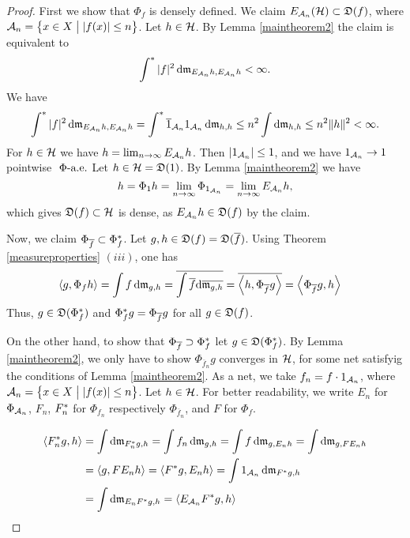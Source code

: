 \begin{proof}

First we show that $\Phi_f$ is densely defined. 
We claim $E_{\mathcal{A}_n}(\mathcal{H}) \subset \mathfrak{D}(f)$, where $\mathcal{A}_n = 
\left\lbrace x \in X \bigm | | f(x) | \leq n \right\rbrace$.
Let $h \in \mathcal{H}$. By Lemma \ref{maintheorem2} the claim is
equivalent to 
\[
\int ^{*} |f|^2 \operatorname{d}\! \mathfrak{m}_{E_{\mathcal{A}_n}h, E_{\mathcal{A}_n}h} < \infty.
\]
We have 
\begin{align*}
  \int ^{*} |f|^2 \operatorname{d}\! \mathfrak{m}_{E_{\mathcal{A}_n}h, E_{\mathcal{A}_n}h} = 
  \int ^{*} \overline{1}_{\mathcal{A}_n} 1_{\mathcal{A}_n} \operatorname{d}\! \mathfrak{m}_{h,h} \leq
  n^2 \int \operatorname{d}\! \mathfrak{m}_{h,h} \leq n^2 \| h\|^2 < \infty.
\end{align*}
For $h \in \mathcal{H}$ we have $h = \lim_{n \to \infty} E_{\mathcal{A}_n} h$. 
Then $|1_{\mathcal{A}_n}| \leq 1$, and we have
$1_{\mathcal{A}_n} \to 1 $ pointwise $~\Phi\text{-a.e.}$
Let $h \in \mathcal{H} = \mathfrak{D}(1)$. By Lemma \ref{maintheorem2} we have
\[
h = \Phi_1 h = \lim_{n \to \infty} \Phi_{1_{\mathcal{A}_n}} =
\lim_{n \to \infty} E_{\mathcal{A}_n} h , 
\]
which gives $\mathfrak{D}(f) \subset \mathcal{H}$ is dense, as $E_{\mathcal{A}_n} h \in \mathfrak{D}(f)$ by
the claim. 

Now, we claim $ \Phi_{\overline{f}} \subset \Phi_f ^{*}$.
Let  $g,h \in \mathfrak{D}(f) = \mathfrak{D}(\overline{f})$. Using Theorem \ref{measureproperties} $
(iii)$, one has
\begin{align*}
  \left\langle g, \Phi_f h \right\rangle &= \int f \operatorname{d}\! \mathfrak{m}_{g,h} 
  = \overline{ \int \overline{f} \text{d}\overline{\mathfrak{m}_{g,h}}} 
  = \overline{ \left\langle h , \Phi_{\overline{f}} g  \right\rangle} 
  = \left\langle \Phi_{\overline{f} }g , h \right\rangle
\end{align*}
Thus, $g \in \mathfrak{D}(\Phi_f ^{*})$ and $\Phi_f ^{*} g = \Phi_{\overline{f}} g$
for all $g \in \mathfrak{D}(f)$.

On the other hand, to show that  $\Phi_{\overline{f}} \supset \Phi_f ^{*}$
let $g\in \mathfrak{D}(\Phi_f ^{*})$.
By Lemma \ref{maintheorem2}, we only have to show $\Phi_{\overline{f}_n}g$
converges in $\mathcal{H}$, for some net satisfyig the conditions of Lemma
\ref{maintheorem2}. As a net, we take $f_n = f \cdot 1_{\mathcal{A}_n}$,
where $\mathcal{A}_n = \left\lbrace x \in X \bigm | | f(x) | \leq n \right\rbrace$.
Let $h \in \mathcal{H}$. For better readability, we write $E_n$ for 
$\Phi_{\mathcal{A}_n}$, $F_n$, $F_n^{*}$ for $\Phi_{f_n}$ 
respectively $\Phi_{\overline{f}_n}$, and 
$F$ for $\Phi_f$.

\begin{align*}
\left\langle  F_n^{*} g, h  \right\rangle& = \int \operatorname{d}\! \mathfrak{m}_{F_n^{*} g, h}
= \int f_n \operatorname{d}\! \mathfrak{m}_{g,h} 
= \int f \operatorname{d}\! \mathfrak{m}_{g, E_{n} h }
= \int \operatorname{d}\! \mathfrak{m}_{g, F E_{n} h} \\
&= \left\langle g, F E_{n} h \right\rangle 
= \left\langle F ^{*} g, E_{n} h \right\rangle
= \int 1_{\mathcal{A}_n} \operatorname{d}\! \mathfrak{m}_{F ^{*} g, h}\\
&= \int \operatorname{d}\! \mathfrak{m}_{E_{n} F ^{*} g, h} = \left\langle E_{\mathcal{A}_n}  F ^{*} g, h \right\rangle
\end{align*}


\end{proof}
